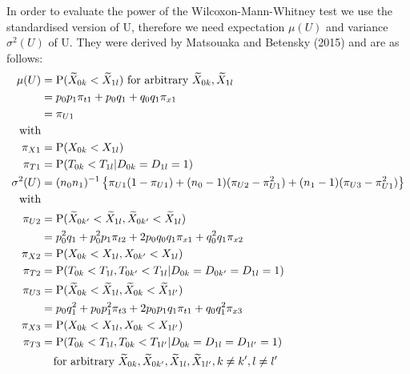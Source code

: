 \documentclass[bimj,fleqn]{w-art}\usepackage[]{graphicx}\usepackage[]{color}
\theoremstyle{plain}
\theoremstyle{definition}
\begin{document}
	In order to evaluate the power of the Wilcoxon-Mann-Whitney test we use the
  standardised version of U, therefore we need expectation $\mu(U)$ and
  variance  $\sigma^2(U)$ of U. They were derived by Matsouaka and Betensky
  (2015) and are as follows:
  \begin{align*}
  \mu(U) &= \text{P}(\widetilde{X}_{0k} < \widetilde{X}_{1l}) \mbox{ for arbitrary }
                 \widetilde{X}_{0k}, \widetilde{X}_{1l} \\
         &= p_0 p_1 \pi_{t1} + p_0 q_1 + q_0 q_1 \pi_{x1} \\
         &= \pi_{U1}\\
  \mbox{with}   \\
  \pi_{X1} &= \text{P}(X_{0k} < X_{1l}) \\
  \pi_{T1} &= \text{P}(T_{0k} < T_{1l} | D_{0k} = D_{1l} = 1) \\
  \sigma^2(U) &= (n_0 n_1)^{-1} \left\{ \pi_{U1} (1 - \pi_{U1}) +
                                    (n_0 - 1) (\pi_{U2} - \pi_{U1}^2) +
                                    (n_1 - 1) (\pi_{U3} - \pi_{U1}^2) \right\} \\
  \mbox{with} \\
  \pi_{U2} &= \text{P}(\widetilde{X}_{0k'} < \widetilde{X}_{1l}, \widetilde{X}_{0k'} < \widetilde{X}_{1l}) \\
           &= p_0^2 q_1 + p_0^2 p_1 \pi_{t2} + 2 p_0 q_0 q_1 \pi_{x1} + q_0^2 q_1 \pi_{x2} \\
  \pi_{X2} &= \text{P}(X_{0k} < X_{1l}, X_{0k'} < X_{1l}) \\
  \pi_{T2} &= \text{P}(T_{0k} < T_{1l}, T_{0k'} < T_{1l} | D_{0k} = D_{0k'} = D_{1l} = 1) \\
  \pi_{U3} &= \text{P}(\widetilde{X}_{0k} < \widetilde{X}_{1l}, \widetilde{X}_{0k} < \widetilde{X}_{1l'}) \\
           &= p_0 q_1^2 + p_0 p_1^2 \pi_{t3} + 2 p_0 p_1 q_1 \pi_{t1} + q_0 q_1^2 \pi_{x3} \\
  \pi_{X3} &= \text{P}(X_{0k} < X_{1l}, X_{0k} < X_{1l'}) \\
  \pi_{T3} &= \text{P}(T_{0k} < T_{1l}, T_{0k} < T_{1l'} | D_{0k} = D_{1l} = D_{1l'} =1)\\
           &{\hphantom{=}}  \mbox{ for arbitrary } \widetilde{X}_{0k}, \widetilde{X}_{0k'}, \widetilde{X}_{1l},
                                       \widetilde{X}_{1l'}, k \ne k', l \ne l'
  \end{align*}
\end{document}
